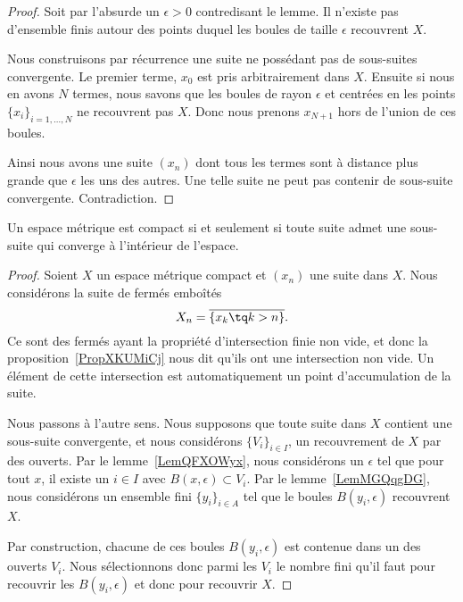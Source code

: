 \begin{proof}
    Soit par l'absurde un \( \epsilon>0\) contredisant le lemme. Il n'existe pas d'ensemble finis autour des points duquel les boules de taille \( \epsilon\) recouvrent \( X\).

    Nous construisons par récurrence une suite ne possédant pas de sous-suites convergente. Le premier terme, \( x_0\) est pris arbitrairement dans \( X\). Ensuite si nous en avons \( N\) termes, nous savons que les boules de rayon \( \epsilon\) et centrées en les points \( \{ x_i \}_{i=1,\ldots, N}\) ne recouvrent pas \( X\). Donc nous prenons \( x_{N+1}\) hors de l'union de ces boules.

    Ainsi nous avons une suite \( (x_n)\) dont tous les termes sont à distance plus grande que \( \epsilon\) les uns des autres. Une telle suite ne peut pas contenir de sous-suite convergente. Contradiction.
\end{proof}

\begin{theorem}\label{ThoBWFTXAZNH}
    Un espace métrique est compact si et seulement si toute suite admet une sous-suite qui converge à l'intérieur de l'espace.
\end{theorem}

\begin{proof}
   Soient \( X\) un espace métrique compact et \( (x_n)\) une suite dans \( X\). Nous considérons la suite de fermés emboîtés
   \begin{equation}
       X_n=\overline{ \{ x_k\tq k>n \} }.
   \end{equation}
   Ce sont des fermés ayant la propriété d'intersection finie non vide, et donc la proposition~\ref{PropXKUMiCj} nous dit qu'ils ont une intersection non vide. Un élément de cette intersection est automatiquement un point d'accumulation de la suite.

   Nous passons à l'autre sens. Nous supposons que toute suite dans \( X\) contient une sous-suite convergente, et nous considérons \( \{ V_i \}_{i\in I}\), un recouvrement de \( X\) par des ouverts. Par le lemme~\ref{LemQFXOWyx}, nous considérons un \( \epsilon\) tel que pour tout \( x\), il existe un \( i\in I\) avec \( B(x,\epsilon)\subset V_i\). Par le lemme~\ref{LemMGQqgDG}, nous considérons un ensemble fini \( \{ y_i \}_{i\in A}\) tel que le boules \( B(y_i,\epsilon)\) recouvrent \( X\).

   Par construction, chacune de ces boules \( B(y_i,\epsilon)\) est contenue dans un des ouverts \( V_i\). Nous sélectionnons donc parmi les \( V_i\) le nombre fini qu'il faut pour recouvrir les \( B(y_i,\epsilon)\) et donc pour recouvrir \( X\).
\end{proof}

